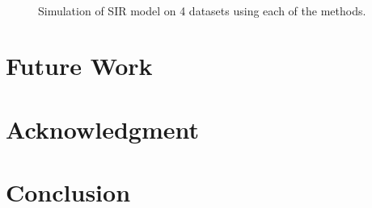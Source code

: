 \documentclass[sigconf]{acmart}
\newcommand{\graphicsplaceholder}[2]{%
	\begin{tcolorbox}[valign=center,width=#1,height=#2,arc=0.5mm,auto outer arc]%
		\centering%
		\sf missing graphic%
	\end{tcolorbox}%
}
\begin{document}
	
\begin{figure}[!htpb]
	\centering
	\\
	\caption{Simulation of SIR model on 4 datasets using each of the methods.}
	\label{SIR simulation}
\end{figure}


\section{Future Work}

\section{Acknowledgment}


\section{Conclusion}





\end{document}

